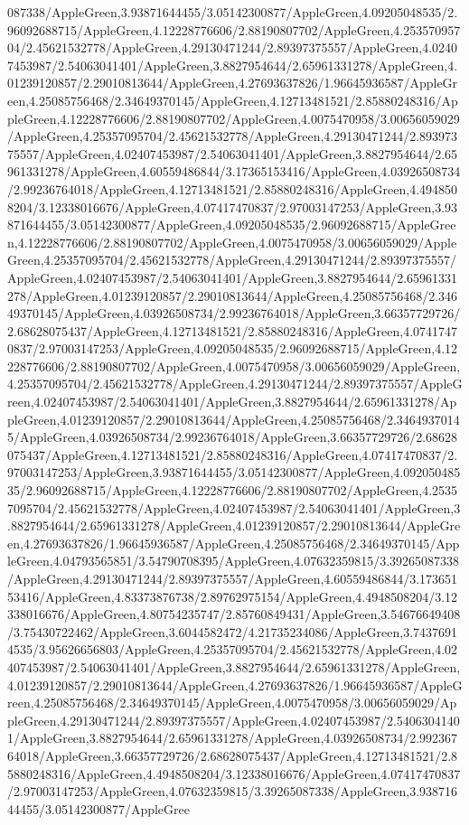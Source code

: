 {\begin{tikzternal}
087338/AppleGreen,3.93871644455/3.05142300877/AppleGreen,4.09205048535/2.96092688715/AppleGreen,4.12228776606/2.88190807702/AppleGreen,4.25357095704/2.45621532778/AppleGreen,4.29130471244/2.89397375557/AppleGreen,4.02407453987/2.54063041401/AppleGreen,3.8827954644/2.65961331278/AppleGreen,4.01239120857/2.29010813644/AppleGreen,4.27693637826/1.96645936587/AppleGreen,4.25085756468/2.34649370145/AppleGreen,4.12713481521/2.85880248316/AppleGreen,4.12228776606/2.88190807702/AppleGreen,4.0075470958/3.00656059029/AppleGreen,4.25357095704/2.45621532778/AppleGreen,4.29130471244/2.89397375557/AppleGreen,4.02407453987/2.54063041401/AppleGreen,3.8827954644/2.65961331278/AppleGreen,4.60559486844/3.17365153416/AppleGreen,4.03926508734/2.99236764018/AppleGreen,4.12713481521/2.85880248316/AppleGreen,4.4948508204/3.12338016676/AppleGreen,4.07417470837/2.97003147253/AppleGreen,3.93871644455/3.05142300877/AppleGreen,4.09205048535/2.96092688715/AppleGreen,4.12228776606/2.88190807702/AppleGreen,4.0075470958/3.00656059029/AppleGreen,4.25357095704/2.45621532778/AppleGreen,4.29130471244/2.89397375557/AppleGreen,4.02407453987/2.54063041401/AppleGreen,3.8827954644/2.65961331278/AppleGreen,4.01239120857/2.29010813644/AppleGreen,4.25085756468/2.34649370145/AppleGreen,4.03926508734/2.99236764018/AppleGreen,3.66357729726/2.68628075437/AppleGreen,4.12713481521/2.85880248316/AppleGreen,4.07417470837/2.97003147253/AppleGreen,4.09205048535/2.96092688715/AppleGreen,4.12228776606/2.88190807702/AppleGreen,4.0075470958/3.00656059029/AppleGreen,4.25357095704/2.45621532778/AppleGreen,4.29130471244/2.89397375557/AppleGreen,4.02407453987/2.54063041401/AppleGreen,3.8827954644/2.65961331278/AppleGreen,4.01239120857/2.29010813644/AppleGreen,4.25085756468/2.34649370145/AppleGreen,4.03926508734/2.99236764018/AppleGreen,3.66357729726/2.68628075437/AppleGreen,4.12713481521/2.85880248316/AppleGreen,4.07417470837/2.97003147253/AppleGreen,3.93871644455/3.05142300877/AppleGreen,4.09205048535/2.96092688715/AppleGreen,4.12228776606/2.88190807702/AppleGreen,4.25357095704/2.45621532778/AppleGreen,4.02407453987/2.54063041401/AppleGreen,3.8827954644/2.65961331278/AppleGreen,4.01239120857/2.29010813644/AppleGreen,4.27693637826/1.96645936587/AppleGreen,4.25085756468/2.34649370145/AppleGreen,4.04793565851/3.54790708395/AppleGreen,4.07632359815/3.39265087338/AppleGreen,4.29130471244/2.89397375557/AppleGreen,4.60559486844/3.17365153416/AppleGreen,4.83373876738/2.89762975154/AppleGreen,4.4948508204/3.12338016676/AppleGreen,4.80754235747/2.85760849431/AppleGreen,3.54676649408/3.75430722462/AppleGreen,3.6044582472/4.21735234086/AppleGreen,3.74376914535/3.95626656803/AppleGreen,4.25357095704/2.45621532778/AppleGreen,4.02407453987/2.54063041401/AppleGreen,3.8827954644/2.65961331278/AppleGreen,4.01239120857/2.29010813644/AppleGreen,4.27693637826/1.96645936587/AppleGreen,4.25085756468/2.34649370145/AppleGreen,4.0075470958/3.00656059029/AppleGreen,4.29130471244/2.89397375557/AppleGreen,4.02407453987/2.54063041401/AppleGreen,3.8827954644/2.65961331278/AppleGreen,4.03926508734/2.99236764018/AppleGreen,3.66357729726/2.68628075437/AppleGreen,4.12713481521/2.85880248316/AppleGreen,4.4948508204/3.12338016676/AppleGreen,4.07417470837/2.97003147253/AppleGreen,4.07632359815/3.39265087338/AppleGreen,3.93871644455/3.05142300877/AppleGree
\end{tikzternal}}
